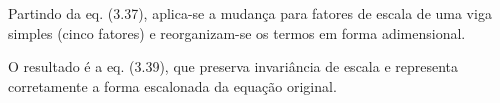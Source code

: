 Partindo da eq. (3.37), aplica-se a mudança para fatores de escala de uma viga simples (cinco fatores) e reorganizam-se os termos em forma adimensional.

O resultado é a eq. (3.39), que preserva invariância de escala e representa corretamente a forma escalonada da equação original.

